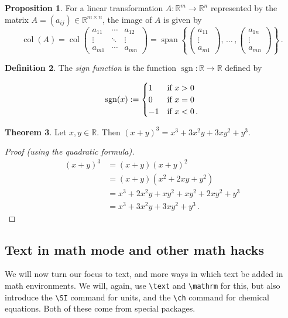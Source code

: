 \documentclass[11pt,letterpaper,titlepage]{article}
\numberwithin{equation}{section}
\numberwithin{figure}{section}
\numberwithin{table}{section}
\numberwithin{algorithm}{section}
\theoremstyle{definition}
\newtheorem{theorem}{Theorem}[section] %
\newtheorem{definition}[theorem]{Definition} %
\newtheorem{proposition}[theorem]{Proposition}
\DeclareMathOperator{\col}{col}
\DeclareMathOperator{\spn}{span}
\newcommand{\R}{\mathbb{R}}
\begin{document}
\begin{proposition} For a linear transformation $A:\R^m \rightarrow \R^n$ represented by the matrix $A = (a_{ij})\in\R^{m\times n}$, the image of $A$ is given by
\[
\col(A)=
\col\begin{pmatrix}
a_{11} & \cdots & a_{12}\\
\vdots & \ddots & \vdots\\
a_{m1} & \cdots & a_{mn}
\end{pmatrix}
=
\spn\left\{
    \begin{pmatrix}
        a_{11}\\\vdots\\a_{m1}
    \end{pmatrix}
    , \, \ldots \, ,
    \begin{pmatrix}
        a_{1n}\\\vdots\\a_{mn}
    \end{pmatrix} 
\right\}\,.
\]
\end{proposition}

\begin{definition}
The \emph{sign function} is the function $\operatorname{sgn}\colon \R\to\R$ defined by

\[
\operatorname{sgn}(x):=
\begin{cases}
1   &\text{if $x>0$}\\
0   &\text{if $x=0$}\\
-1  &\text{if $x<0$\,.}
\end{cases}
\]

\end{definition}

\begin{theorem}
\label{thm:cubic}
Let $x,y\in \R$. Then $(x+y)^3=x^3+3x^2y+3xy^2+y^3$.
\end{theorem}

\begin{proof}[Proof (using the quadratic formula)]
\begin{align*}
(x+y)^3 &=(x+y)(x+y)^2\\
        &=(x+y)(x^2+2xy+y^2)\\
        &=x^3+2x^2y+xy^2+xy^2+2xy^2+y^3\\
        &=x^3+3x^2y+3xy^2+y^3\,.\tag*{\qedhere}
\end{align*}
\end{proof}

\subsection{Text in math mode and other math hacks}
We will now turn our focus to text, and more ways in which text  be added in math environments. We will, again, use \verb$\text$ and \verb$\mathrm$ for this, but also introduce the \verb$\SI$ command for units, and the \verb$\ch$ command for chemical equations. Both of these come from special packages.
\end{document}
